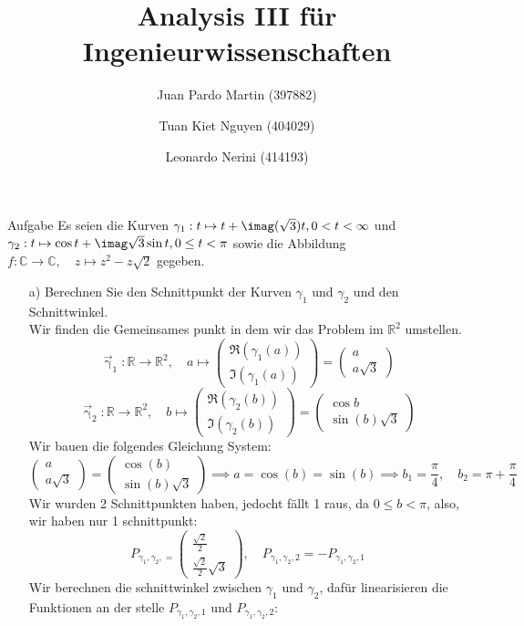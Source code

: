 \documentclass{scrartcl}
\title{Analysis III für Ingenieurwissenschaften}
\author{Juan Pardo Martin (397882)\and Tuan Kiet Nguyen (404029)\and Leonardo Nerini (414193)}
\def\mbb#1{\mathbb{#1}}
\def\bC{\mbb{C}}
\def\bR{\mbb{R}}
\newcommand{\func}[3]{#1\colon#2\to#3}
\newcommand{\vfunc}[5]{\func{#1}{#2}{#3},\quad#4\longmapsto#5}
\begin{document}
\maketitle
\begin{section}{Aufgabe}%
Es seien die Kurven \(\gamma_1 : t \mapsto t + \imag(\sqrt 3)t, 0 < t < \infty\) 
und 
\(\gamma_2 : t \mapsto \cos t + \imag\sqrt 3 \sin t, 0 \leq t < \pi\)
sowie die Abbildung \(\vfunc{f}{\bC}{\bC}{z}{z^2-z\sqrt 2}\)
 gegeben.
\begin{itemize}
\item[a)]
Berechnen Sie den Schnittpunkt der Kurven $\gamma_1$ und $\gamma_2$ und den Schnittwinkel.\\
Wir finden die Gemeinsames punkt in dem wir das Problem im $\bR^2$ umstellen.
\[\vfunc{\vec{\upgamma}_1}{\bR}{\bR^2}{a}{\begin{pmatrix}\Re(\gamma_1(a))\\\Im(\gamma_1(a))\end{pmatrix}
=\begin{pmatrix}a\\a\sqrt{3}\end{pmatrix}}\]
\[\vfunc{\vec{\upgamma}_2}{\bR}{\bR^2}{b}{\begin{pmatrix}\Re(\gamma_2(b))\\\Im(\gamma_2(b))\end{pmatrix}
=\begin{pmatrix}\cos b\\\sin(b)\sqrt{3}\end{pmatrix}}\]
Wir bauen die folgendes Gleichung System:
\[\begin{pmatrix}a\\a\sqrt{3}\end{pmatrix}=\begin{pmatrix}\cos(b)\\\sin(b)\sqrt{3}\end{pmatrix}
\implies a=\cos(b)=\sin(b)\implies b_1=\frac{\pi}{4},\quad b_2=\pi+\frac{\pi}{4}\]
Wir wurden 2 Schnittpunkten haben, jedocht fällt 1 raus, da $0 \leq b < \pi$, also, wir haben nur 1 schnittpunkt:
\newcommand{\schnt}[3]{P_{#1,#2,#3}}
\[\schnt{\gamma_1}{\gamma_2}=\begin{pmatrix}\frac{\sqrt{2}}{2}\\\frac{\sqrt{2}}{2} \sqrt{3}\end{pmatrix},\quad \schnt{\gamma_1}{\gamma_2}{2}=-\schnt{\gamma_1}{\gamma_2}{1}\]
Wir berechnen die schnittwinkel zwischen $\gamma_1$ und $\gamma_2$, dafür linearisieren die Funktionen an der stelle $\schnt{\gamma_1}{\gamma_2}{1}$ und $\schnt{\gamma_1}{\gamma_2}{2}$:\\

\end{itemize}
\end{section}
\end{document}
